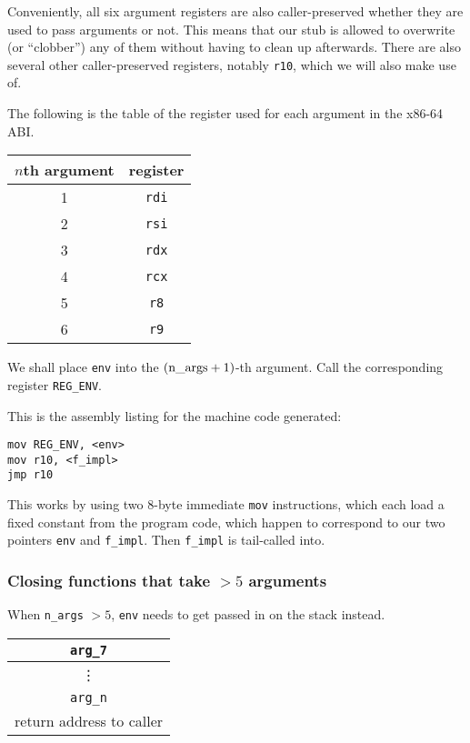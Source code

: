 \documentclass[12pt,a4paper,twoside,openright]{report}
\begin{document}
Conveniently, all six argument registers are also caller-preserved whether they
are used to pass arguments or not. This means that our stub is allowed to
overwrite (or ``clobber'') any of them without having to clean up afterwards.
There are also several other caller-preserved registers, notably
\lstinline!r10!, which we will also make use of.

The following is the table of the register used for each argument in the x86-64
ABI.

\begin{tabular}{ c | c }
  $n$th argument & register \\
  \hline
  1 & \lstinline!rdi! \\
  2 & \lstinline!rsi! \\
  3 & \lstinline!rdx! \\
  4 & \lstinline!rcx! \\
  5 & \lstinline!r8! \\
  6 & \lstinline!r9!
\end{tabular}

We shall place \lstinline!env! into the $(\text{\lstinline|n\_args|}+1)$-th
argument. Call the corresponding register \lstinline!REG_ENV!.

This is the assembly listing for the machine code generated:

\begin{lstlisting}
mov REG_ENV, <env>
mov r10, <f_impl>
jmp r10
\end{lstlisting}

This works by using two 8-byte immediate \lstinline!mov! instructions, which
each load a fixed constant from the program code, which happen to correspond to
our two pointers \lstinline!env! and \lstinline!f_impl!.
Then \lstinline!f_impl! is tail-called into.

\subsubsection{Closing functions that take $> 5$ arguments}

When \lstinline!n_args! $> 5$, \lstinline!env! needs to get passed in on the
stack instead.

\begin{tabular}{c}
  \lstinline!arg_7!
  \\ \hline
  \vdots
  \\ \hline
  \lstinline!arg_n!
  \\ \hline\hline
  return address to caller
\end{tabular}
\end{document}
